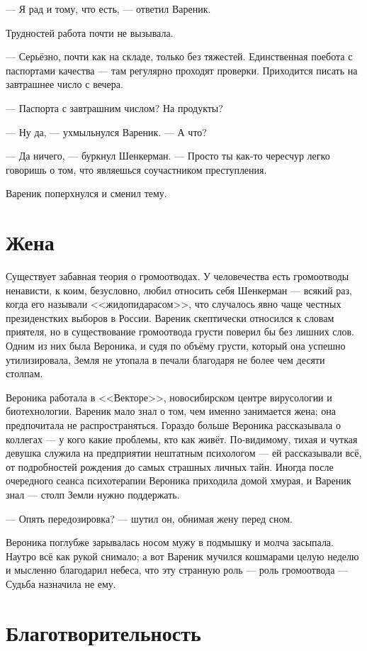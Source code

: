 \documentclass[a4paper,10pt,fleqn]{book}\usepackage{polyglossia}\setdefaultlanguage{english}\setotherlanguage{russian}\defaultfontfeatures{Ligatures=TeX,Mapping=tex-text} \usepackage{xcolor}\definecolor{lightgray}{HTML}{bbbbbb}\color{lightgray}\newcommand{\ml}[3]{\textcolor{black}{#3}}
\begin{document}
--- Я рад и тому, что есть, --- ответил Вареник.

Трудностей работа почти не вызывала.

--- Серьёзно, почти как на складе, только без тяжестей.
Единственная поебота с паспортами качества --- там регулярно проходят проверки.
Приходится писать на завтрашнее число с вечера.

--- Паспорта с завтрашним числом?
На продукты?

--- Ну да, --- ухмыльнулся Вареник.
--- А что?

--- Да ничего, --- буркнул Шенкерман.
--- Просто ты как-то чересчур легко говоришь о том, что являешься соучастником преступления.

Вареник поперхнулся и сменил тему.

\section{Жена}

Существует забавная теория о громоотводах.
У человечества есть громоотводы ненависти, к коим, безусловно, любил относить себя Шенкерман --- всякий раз, когда его называли <<жидопидарасом>>, что случалось явно чаще честных президенстких выборов в России.
Вареник скептически относился к словам приятеля, но в существование громоотвода грусти поверил бы без лишних слов.
Одним из них была Вероника, и судя по объёму грусти, который она успешно утилизировала, Земля не утопала в печали благодаря не более чем десяти столпам.

Вероника работала в <<Векторе>>, новосибирском центре вирусологии и биотехнологии.
Вареник мало знал о том, чем именно занимается жена;
она предпочитала не распространяться.
Гораздо больше Вероника рассказывала о коллегах --- у кого какие проблемы, кто как живёт.
По-видимому, тихая и чуткая девушка служила на предприятии нештатным психологом --- ей рассказывали всё, от подробностей рождения до самых страшных личных тайн.
Иногда после очередного сеанса психотерапии Вероника приходила домой хмурая, и Вареник знал --- столп Земли нужно поддержать.

--- Опять передозировка? --- шутил он, обнимая жену перед сном.

Вероника поглубже зарывалась носом мужу в подмышку и молча засыпала.
Наутро всё как рукой снимало;
а вот Вареник мучился кошмарами целую неделю и мысленно благодарил небеса, что эту странную роль --- роль громоотвода --- Судьба назначила не ему.

\section{Благотворительность}
\end{document}
